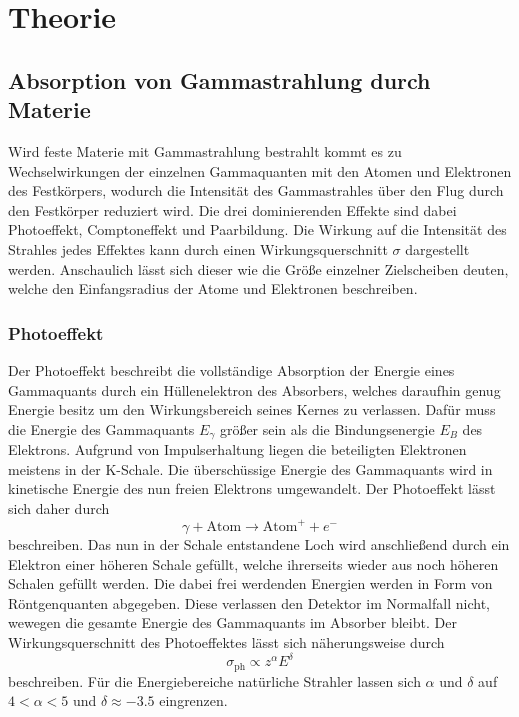 
\section{Theorie}
\label{sec:Theorie}
\subsection{Absorption von Gammastrahlung durch Materie}
Wird feste Materie mit Gammastrahlung bestrahlt  kommt es zu Wechselwirkungen der einzelnen Gammaquanten mit den Atomen und Elektronen des Festkörpers, wodurch die Intensität des Gammastrahles über den Flug durch den Festkörper reduziert wird. Die drei dominierenden Effekte sind dabei Photoeffekt, Comptoneffekt und Paarbildung. Die Wirkung auf die Intensität des Strahles jedes Effektes kann durch einen Wirkungsquerschnitt $\sigma$ dargestellt werden. Anschaulich lässt sich dieser wie die Größe einzelner Zielscheiben deuten, welche den Einfangsradius der Atome und Elektronen beschreiben.

\subsubsection{Photoeffekt}
Der Photoeffekt beschreibt die vollständige Absorption der Energie eines Gammaquants durch ein Hüllenelektron des Absorbers, welches daraufhin genug Energie besitz um den Wirkungsbereich seines Kernes zu verlassen. Dafür muss die Energie des Gammaquants $E_\gamma$ größer sein als die Bindungsenergie $E_B$ des Elektrons. Aufgrund von Impulserhaltung liegen die beteiligten Elektronen meistens in der K-Schale. Die überschüssige Energie des Gammaquants wird in kinetische Energie des nun freien Elektrons umgewandelt. Der Photoeffekt lässt sich daher durch 
\begin{equation}
    \gamma + \text{Atom} \to \text{Atom}^+ + e^-
\end{equation}
beschreiben. Das nun in der Schale entstandene Loch wird anschließend durch ein Elektron einer höheren Schale gefüllt, welche ihrerseits wieder aus noch höheren Schalen gefüllt werden.
Die dabei frei werdenden Energien werden in Form von Röntgenquanten abgegeben. Diese verlassen den Detektor im Normalfall nicht, wewegen die gesamte Energie des Gammaquants im Absorber bleibt.
Der Wirkungsquerschnitt des Photoeffektes lässt sich näherungsweise durch
\begin{equation}
    \sigma_\text{ph} \propto z^\alpha E^\delta
\end{equation}
beschreiben. Für die Energiebereiche natürliche Strahler lassen sich $\alpha$ und $\delta$ auf $4 < \alpha <5 $ und $\delta \approx -3.5$ eingrenzen. 

